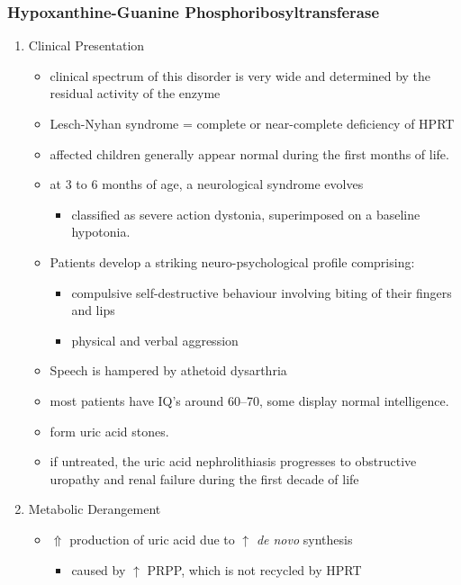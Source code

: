 \documentclass{scrartcl}
\begin{document}
\subsubsection{Hypoxanthine-Guanine Phosphoribosyltransferase}
\label{sec:orgf226fbe}
\begin{enumerate}
\item Clinical Presentation
\label{sec:org9ed1426}
\begin{itemize}
\item clinical spectrum of this disorder is very wide and determined by
the residual activity of the enzyme
\item Lesch-Nyhan syndrome = complete or near-complete deficiency of HPRT
\item affected children generally appear normal during the first months of
life.
\item at 3 to 6 months of age, a neurological syndrome evolves
\begin{itemize}
\item classified as severe action dystonia, superimposed on a baseline hypotonia.
\end{itemize}
\item Patients develop a striking neuro-psychological profile comprising:
\begin{itemize}
\item compulsive self-destructive behaviour involving biting of their
fingers and lips
\item physical and verbal aggression
\end{itemize}
\item Speech is hampered by athetoid dysarthria
\item most patients have IQ’s around 60–70, some display normal intelligence.
\item form uric acid stones.
\item if untreated, the uric acid nephrolithiasis progresses to
obstructive uropathy and renal failure during the first decade of
life
\end{itemize}

\item Metabolic Derangement
\label{sec:org0a2642a}
\begin{itemize}
\item \(\Uparrow\) production of uric acid due to \(\uparrow\) \emph{de novo} synthesis
\begin{itemize}
\item caused by \(\uparrow\) PRPP, which is not recycled by HPRT
\end{itemize}
\end{itemize}


\end{enumerate}
\end{document}
